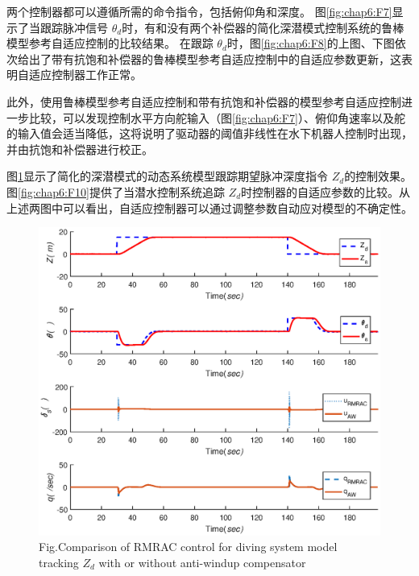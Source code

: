 
两个控制器都可以遵循所需的命令指令，包括俯仰角和深度。 图\ref {fig:chap6:F7}显示了当跟踪脉冲信号 $\theta_d$时，有和没有两个补偿器的简化深潜模式控制系统的鲁棒模型参考自适应控制的比较结果。 在跟踪 $\theta_{d}$时，图\ref {fig:chap6:F8}的上图、下图依次给出了带有抗饱和补偿器的鲁棒模型参考自适应控制中的自适应参数更新，这表明自适应控制器工作正常。

此外，使用鲁棒模型参考自适应控制和带有抗饱和补偿器的模型参考自适应控制进一步比较，可以发现控制水平方向舵输入（图\ref {fig:chap6:F7}）、俯仰角速率以及舵的输入值会适当降低，这将说明了驱动器的阈值非线性在水下机器人控制时出现，并由抗饱和补偿器进行校正。


图\ref {fig:chap6:F9}显示了简化的深潜模式的动态系统模型跟踪期望脉冲深度指令 $Z_d$的控制效果。 图\ref {fig:chap6:F10}提供了当潜水控制系统追踪 $Z_d$时控制器的自适应参数的比较。从上述两图中可以看出，自适应控制器可以通过调整参数自动应对模型的不确定性。

\begin{figure}[!htp]%
\centering
\includegraphics[width=0.85\linewidth]{figure/chap6/Fig_pulsedepth_1.eps}
\label{fig:chap6:F9}
 {Fig.}{Comparison of RMRAC control for diving system model tracking $Z_{d}$ with or without anti-windup compensator}
\end{figure}

